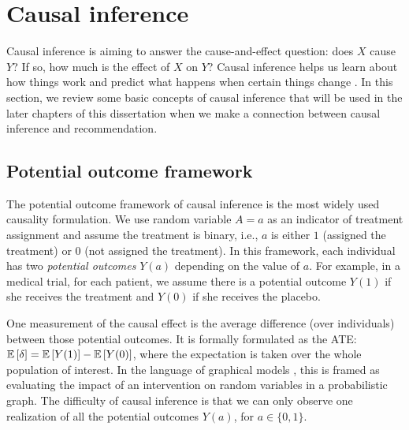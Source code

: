 
\section{Causal inference}\label{chpt:background:sec:causal}

Causal inference is aiming to answer the cause-and-effect question: does $X$ cause $Y$? If so, how much is the effect of $X$ on $Y$? Causal inference helps us learn about how things work and predict what happens when certain things change \citep{morgan2014counterfactuals,imbens2015causal}. 
In this section, we review some basic concepts of causal inference that will be used in the later chapters of this dissertation when we make a connection between causal inference and recommendation.  

\subsection{Potential outcome framework}\label{chpt:background:sec:potential}

The potential outcome framework of causal inference \citep{rubin1974ece} is the most widely used causality formulation. We use random variable $A = a$ as an indicator of treatment assignment and assume the treatment is binary, i.e., $a$ is either $1$ (assigned the treatment) or $0$ (not assigned the treatment). In this framework, each individual has two \textit{potential outcomes} $Y(a)$ depending on the value of $a$. For example, in a medical trial, for each patient, we assume there is a potential outcome $Y(1)$ if she receives the treatment and $Y(0)$ if she receives the placebo. 

One measurement of the causal effect is the average difference (over individuals) between those potential outcomes. It is formally formulated as the \gls{ATE}: $\mathbb{E}\left[\delta\right] = \mathbb{E}\left[Y(1)\right] - \mathbb{E}\left[Y(0)\right]$, where the expectation is taken over the whole population of interest. In the language of graphical models \citep{pearl2009causality},
this is framed as evaluating the impact of an intervention on random variables in a probabilistic graph. The difficulty of causal inference is that we can only observe one realization of all the potential outcomes $Y(a)$, for $a\in\{0, 1\}$. 

